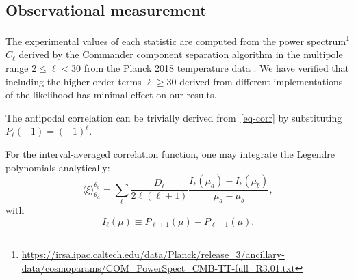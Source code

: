\documentclass[apj,twocolumn,numberedappendix]{openjournal}
\begin{document}
\subsection{Observational measurement}%

The experimental values of each statistic are computed from the power spectrum\footnote{
\url{https://irsa.ipac.caltech.edu/data/Planck/release_3/ancillary-data/cosmoparams/COM_PowerSpect_CMB-TT-full_R3.01.txt}
} $C_\ell$ derived by the Commander component separation algorithm in the multipole range $2 \le \ell < 30$ from the Planck 2018 temperature data \citep{cosmoplanck_2020}.
We have verified that including the higher order terms $\ell \ge 30$ derived from different implementations of the likelihood \citep{cosmoplanck_2020} has minimal effect on our results.

The antipodal correlation can be trivially derived from~\eqref{eq-corr} by substituting $P_\ell(-1) = (-1)^\ell$.

For the interval-averaged correlation function, one may integrate the Legendre polynomials analytically:
\begin{equation}\label{eq-sum-xiv}
\langle\xi\rangle_{\theta_a}^{\theta_b}
=
\sum_\ell
\frac{ D_\ell }{ 2\ell(\ell+1) }
\frac{ I_\ell(\mu_a) - I_\ell(\mu_b) }{ \mu_a - \mu_b },
\end{equation}
with
\begin{equation}
I_\ell(\mu) \equiv P_{\ell+1}(\mu) - P_{\ell-1}(\mu).
\end{equation}
\end{document}
